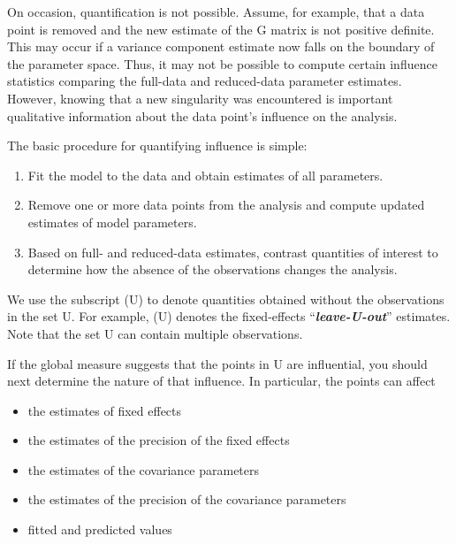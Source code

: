 \documentclass[12pt, a4paper]{report}
\theoremstyle{plain}
\theoremstyle{definition}
\theoremstyle{remark}
\begin{document}

On occasion, quantification is not possible. Assume, for example, that a data point is removed
and the new estimate of the G matrix is not positive definite. This may occur if a variance component
estimate now falls on the boundary of the parameter space. Thus, it may not be possible to compute certain
influence statistics comparing the full-data and reduced-data parameter estimates. However, knowing that
a new singularity was encountered is important qualitative information about the data point’s influence on
the analysis.

The basic procedure for quantifying influence is simple:

\begin{enumerate}
	\item Fit the model to the data and obtain estimates of all parameters.
	\item Remove one or more data points from the analysis and compute updated estimates of model parameters.
	\item Based on full- and reduced-data estimates, contrast quantities of interest to determine how the absence
	of the observations changes the analysis.
\end{enumerate}
We use the subscript (U) to denote quantities obtained without the observations in the set U. For example,
(U) denotes the fixed-effects “\textit{\textbf{leave-U-out}}” estimates. Note that the set U can contain multiple observations.


If the global measure suggests that the points in U are influential, you should next determine the nature of
that influence. In particular, the points can affect
\begin{itemize}
	\item the estimates of fixed effects
	\item the estimates of the precision of the fixed effects
	\item the estimates of the covariance parameters
	\item the estimates of the precision of the covariance parameters
	\item fitted and predicted values
\end{itemize}
\end{document}
